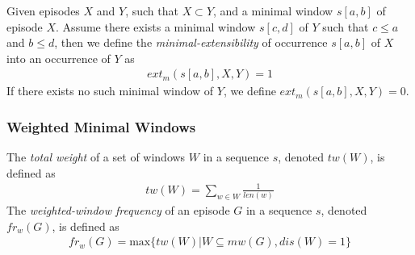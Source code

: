 \begin{definition}
Given episodes $ X $ and $ Y $, such that $ X \subset Y $, and a minimal window $ s[a, b] $ of episode $ X $. Assume there exists a minimal window $ s[c, d] $ of $ Y $ such that $ c \leq a $ and $ b \leq d $, then we define the \emph{minimal-extensibility} of occurrence $ s[a, b] $ of $ X $ into an occurrence of $ Y $ as
\begin{align*}
ext_m(s[a, b], X, Y) = 1
\end{align*}
If there exists no such minimal window of $ Y $, we define $ ext_m(s[a, b], X, Y) = 0 $.
\end{definition}

\subsubsection{Weighted Minimal Windows}

\begin{definition}
The \emph{total weight} of a set of windows $ W $ in a sequence $ s $, denoted $ tw(W) $, is defined as
\begin{align*}
tw(W) = \sum_{w \in W}{\frac{1}{len(w)}}
\end{align*}
The \emph{weighted-window frequency} of an episode $ G $ in a sequence $ s $, denoted $ fr_w(G) $, is defined as
\begin{align*}
fr_w(G) = \text{max} \{ tw(W) | W \subseteq mw(G), dis(W) = 1 \}
\end{align*}
\end{definition}
